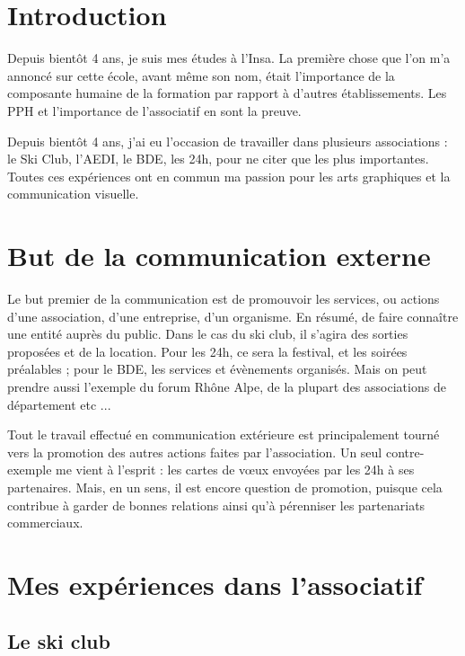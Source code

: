 \section {Introduction}

    Depuis bientôt 4 ans, je suis mes études à l'Insa.
    La première chose que l'on m'a annoncé sur cette école, avant même son nom, était  l'importance de la composante humaine de la formation par rapport à d'autres établissements. Les PPH et l'importance de l'associatif en sont la preuve.

    Depuis bientôt 4 ans, j'ai eu l'occasion de travailler dans plusieurs associations : le Ski Club, l'AEDI, le BDE, les 24h,  pour ne citer que les plus importantes.
    Toutes ces expériences ont en commun ma passion pour les arts graphiques et la communication visuelle.

        
    
\section{But de la communication externe}

    Le but premier de la communication est de promouvoir les services, ou actions d'une association, d'une entreprise, d'un organisme.
    En résumé, de faire connaître une entité auprès du public.
    Dans le cas du ski club, il s'agira des sorties proposées et de la location. Pour les 24h, ce sera la festival, et les soirées préalables ; pour le BDE, les services et évènements organisés.
    Mais on peut prendre aussi l'exemple du forum Rhône Alpe, de la plupart des associations de département etc ...

    Tout le travail effectué en communication extérieure est principalement tourné vers la promotion des autres actions faites par l'association.
    Un seul contre-exemple me vient à l'esprit : les cartes de vœux envoyées par les 24h à ses partenaires.  Mais, en un sens, il est encore question de promotion, puisque cela contribue à garder de bonnes relations ainsi qu'à pérenniser les partenariats commerciaux.


\section{Mes expériences dans l'associatif}

    \subsection{Le ski club}
        
